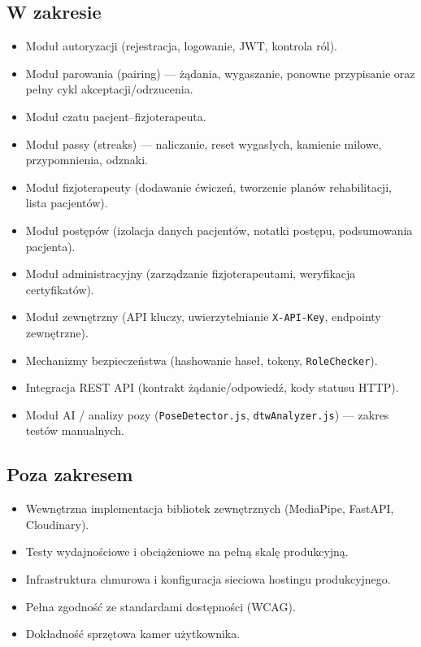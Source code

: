 \documentclass[11pt,a4paper]{article}
\begin{document}
\subsection{W zakresie}
\begin{itemize}
  \item Moduł autoryzacji (rejestracja, logowanie, JWT, kontrola ról).
  \item Moduł parowania (pairing) — żądania, wygaszanie, ponowne przypisanie oraz pełny cykl akceptacji/odrzucenia.
  \item Moduł czatu pacjent–fizjoterapeuta.
  \item Moduł passy (streaks) — naliczanie, reset wygasłych, kamienie milowe, przypomnienia, odznaki.
  \item Moduł fizjoterapeuty (dodawanie ćwiczeń, tworzenie planów rehabilitacji, lista pacjentów).
  \item Moduł postępów (izolacja danych pacjentów, notatki postępu, podsumowania pacjenta).
  \item Moduł administracyjny (zarządzanie fizjoterapeutami, weryfikacja certyfikatów).
  \item Moduł zewnętrzny (API kluczy, uwierzytelnianie \texttt{X-API-Key}, endpointy zewnętrzne).
  \item Mechanizmy bezpieczeństwa (hashowanie haseł, tokeny, \texttt{RoleChecker}).
  \item Integracja REST API (kontrakt żądanie/odpowiedź, kody statusu HTTP).
  \item Moduł AI / analizy pozy (\texttt{PoseDetector.js}, \texttt{dtwAnalyzer.js}) — zakres testów manualnych.
\end{itemize}

\subsection{Poza zakresem}
\begin{itemize}
  \item Wewnętrzna implementacja bibliotek zewnętrznych (MediaPipe, FastAPI, Cloudinary).
  \item Testy wydajnościowe i obciążeniowe na pełną skalę produkcyjną.
  \item Infrastruktura chmurowa i konfiguracja sieciowa hostingu produkcyjnego.
  \item Pełna zgodność ze standardami dostępności (WCAG).
  \item Dokładność sprzętowa kamer użytkownika.
\end{itemize}
\end{document}

